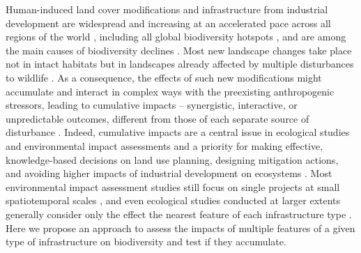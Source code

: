 \documentclass[titlepage]{article}
\begin{document}
Human-induced land cover modifications and infrastructure from industrial development are widespread and increasing at an accelerated pace across all regions of the world \citep{venter_sixteen_2016,ibisch_global_2016}, including all global biodiversity hotspots \citep{sloan_remaining_2014}, and are among the main causes of biodiversity declines \citep{benitez-lopez_impacts_2010,newbold_global_2015}. Most new landscape changes take place not in intact habitats but in landscapes already affected by multiple disturbances to wildlife \citep{barber_roads_2014}. As a consequence, the effects of such new modifications might accumulate and interact in complex ways with the preexisting anthropogenic stressors, leading to cumulative impacts \citep[Box 1; ][]{gillingham_integration_2016} -- synergistic, interactive, or unpredictable outcomes, different from those of each separate source of disturbance \citep{naugle_unifying_2011}. 
Indeed, cumulative impacts are a central issue in ecological studies and environmental impact assessments and a priority for making effective, knowledge-based decisions on land use planning, designing mitigation actions, and avoiding higher impacts of industrial development on ecosystems \citep{gillingham_integration_2016, laurance_roads_2017}. Most environmental impact assessment studies still focus on single projects at small spatiotemporal scales \citep{johnson_regulating_2011}, and even ecological studies conducted at larger extents generally consider only the effect the nearest feature of each infrastructure type \citep[e.g.][]{torres_assessing_2016}. Here we propose an approach to assess the impacts of multiple features of a given type of infrastructure on biodiversity and test if they accumulate. 

\end{document}
